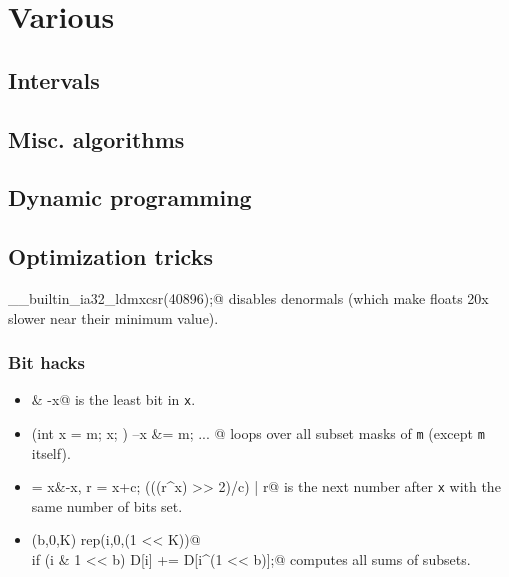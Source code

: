 \chapter{Various}

\section{Intervals}

\section{Misc. algorithms}

\section{Dynamic programming}

\section{Optimization tricks}
\verb@__builtin_ia32_ldmxcsr(40896);@ disables denormals (which make floats 20x slower near their minimum value).
\subsection{Bit hacks}
\begin{itemize}
	\item \verb@x & -x@ is the least bit in \texttt{x}.
	\item \verb@for (int x = m; x; ) { --x &= m; ... }@ loops over all subset masks of \texttt{m} (except \texttt{m} itself).
	\item \verb@c = x&-x, r = x+c; (((r^x) >> 2)/c) | r@ is the next number after \texttt{x} with the same number of bits set.
	\item \verb@rep(b,0,K) rep(i,0,(1 << K))@ \\ \verb@  if (i & 1 << b) D[i] += D[i^(1 << b)];@ computes all sums of subsets.
\end{itemize}
